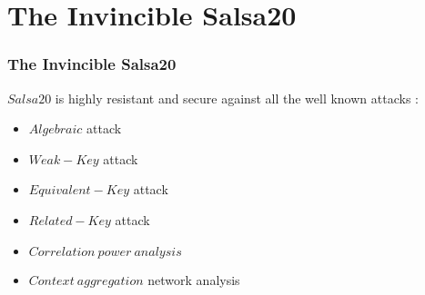 \section{The Invincible Salsa20}

\begin{frame}
\frametitle{The Invincible Salsa20}
\begin{alertblock}{}
    $Salsa20$ is highly resistant and secure against all the well known attacks : 
    \begin{itemize}
        \item $Algebraic$ attack
        \item $Weak-Key$ attack
        \item $Equivalent-Key$ attack
        \item $Related-Key$ attack
        \item $Correlation \ power \ analysis$
        \item $Context \ aggregation$ network analysis
    \end{itemize}
\end{alertblock}

\end{frame}